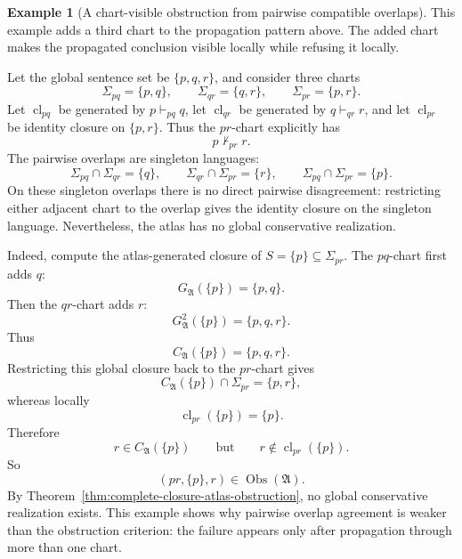 \documentclass[11pt]{amsart}
\numberwithin{equation}{section}
\theoremstyle{plain}
\theoremstyle{definition}
\newtheorem{example}[theorem]{Example}
\theoremstyle{remark}
\newcommand{\Cl}{\operatorname{cl}}
\newcommand{\A}{\mathfrak A}
\newcommand{\Sig}{\Sigma}
\newcommand{\Obs}{\operatorname{Obs}}
\newcommand{\CA}{C_{\mathfrak A}}
\newcommand{\GA}{G_{\mathfrak A}}
\begin{document}
\begin{example}[A chart-visible obstruction from pairwise compatible overlaps]
\label{ex:pairwise-compatible-atlas-not-realizable}
This example adds a third chart to the propagation pattern above.  The added chart makes the propagated conclusion visible locally while refusing it locally.

Let the global sentence set be \(\{p,q,r\}\), and consider three charts
\[
  \Sig_{pq}=\{p,q\},
  \qquad
  \Sig_{qr}=\{q,r\},
  \qquad
  \Sig_{pr}=\{p,r\}.
\]
Let \(\Cl_{pq}\) be generated by \(p\vdash_{pq}q\), let \(\Cl_{qr}\) be generated by \(q\vdash_{qr}r\), and let \(\Cl_{pr}\) be identity closure on \(\{p,r\}\).  Thus the \(pr\)-chart explicitly has
\[
  p\nvdash_{pr} r.
\]
The pairwise overlaps are singleton languages:
\[
  \Sig_{pq}\cap\Sig_{qr}=\{q\},
  \qquad
  \Sig_{qr}\cap\Sig_{pr}=\{r\},
  \qquad
  \Sig_{pq}\cap\Sig_{pr}=\{p\}.
\]
On these singleton overlaps there is no direct pairwise disagreement: restricting either adjacent chart to the overlap gives the identity closure on the singleton language.  Nevertheless, the atlas has no global conservative realization.

Indeed, compute the atlas-generated closure of \(S=\{p\}\subseteq\Sig_{pr}\).  The \(pq\)-chart first adds \(q\):
\[
  \GA(\{p\})=\{p,q\}.
\]
Then the \(qr\)-chart adds \(r\):
\[
  \GA^2(\{p\})=\{p,q,r\}.
\]
Thus
\[
  \CA(\{p\})=\{p,q,r\}.
\]
Restricting this global closure back to the \(pr\)-chart gives
\[
  \CA(\{p\})\cap\Sig_{pr}=\{p,r\},
\]
whereas locally
\[
  \Cl_{pr}(\{p\})=\{p\}.
\]
Therefore
\[
  r\in\CA(\{p\})
  \qquad\text{but}\qquad
  r\notin\Cl_{pr}(\{p\}).
\]
So
\[
  (pr,\{p\},r)\in\Obs(\A).
\]
By Theorem~\ref{thm:complete-closure-atlas-obstruction}, no global conservative realization exists.  This example shows why pairwise overlap agreement is weaker than the obstruction criterion: the failure appears only after propagation through more than one chart.

\begin{figure}[!htbp]
\centering
{}
\end{figure}
\end{example}
\end{document}
